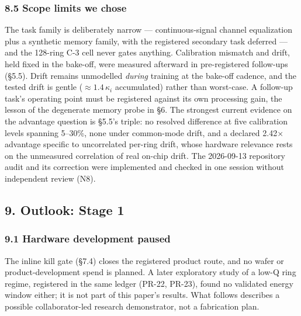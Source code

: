 \documentclass[
  10pt,
]{article}
\newcounter{none} %
\begin{document}
\subsubsection{8.5 Scope limits we chose}\label{scope-limits-we-chose}

The task family is deliberately narrow --- continuous-signal channel
equalization plus a synthetic memory family, with the registered
secondary task deferred --- and the 128-ring C-3 cell never gates
anything. Calibration mismatch and drift, held fixed in the bake-off,
were measured afterward in pre-registered follow-ups (§5.5). Drift
remains unmodelled \emph{during} training at the bake-off cadence, and
the tested drift is gentle (\(\approx 1.4\,\kappa_i\) accumulated)
rather than worst-case. A follow-up task's operating point must be
registered against its own processing gain, the lesson of the degenerate
memory probe in §6. The strongest current evidence on the advantage
question is §5.5's triple: no resolved difference at five calibration
levels spanning 5--30\%, none under common-mode drift, and a declared
2.42× advantage specific to uncorrelated per-ring drift, whose hardware
relevance rests on the unmeasured correlation of real on-chip drift. The
2026-09-13 repository audit and its correction were implemented and
checked in one session without independent review (N8).

\subsection{9. Outlook: Stage 1}\label{outlook-stage-1}

\subsubsection{9.1 Hardware development
paused}\label{hardware-development-paused}

The inline kill gate (§7.4) closes the registered product route, and no
wafer or product-development spend is planned. A later exploratory study
of a low-Q ring regime, registered in the same ledger (PR-22, PR-23),
found no validated energy window either; it is not part of this paper's
results. What follows describes a possible collaborator-led research
demonstrator, not a fabrication plan.
\end{document}
